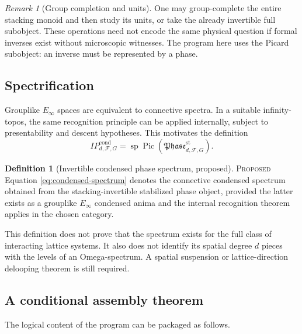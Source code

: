 \documentclass[12pt]{article}
\theoremstyle{definition}
\newtheorem{definition}[theorem]{Definition}
\theoremstyle{remark}
\newtheorem{remark}[theorem]{Remark}
\newcommand{\F}{\mathcal F}
\newcommand{\Phase}{\mathfrak{Phase}}
\newcommand{\Pic}{\operatorname{Pic}}
\newcommand{\IP}{\mathit{IP}}
\newcommand{\PROP}{\textnormal{\textsc{Proposed}}}
\begin{document}
\begin{remark}[Group completion and units]
One may group-complete the entire stacking monoid and then study its units,
or take the already invertible full subobject.  These operations need not
encode the same physical question if formal inverses exist without
microscopic witnesses.  The program here uses the Picard subobject: an
inverse must be represented by a phase.
\end{remark}

\subsection{Spectrification}

Grouplike $E_\infty$ spaces are equivalent to connective spectra.  In a
suitable infinity-topos, the same recognition principle can be applied
internally, subject to presentability and descent hypotheses.  This motivates
the definition
\begin{equation}
\IP^{\mathrm{cond}}_{d,\F,G}
=
\operatorname{sp}
\Pic(\Phase^{\mathrm{st}}_{d,\F,G}).
\label{eq:condensed-spectrum}
\end{equation}

\begin{definition}[Invertible condensed phase spectrum, proposed]
\PROP{}  Equation \cref{eq:condensed-spectrum} denotes the connective
condensed spectrum obtained from the stacking-invertible stabilized phase
object, provided the latter exists as a grouplike $E_\infty$ condensed anima
and the internal recognition theorem applies in the chosen category.
\end{definition}

This definition does not prove that the spectrum exists for the full class
of interacting lattice systems.  It also does not identify its spatial
degree $d$ pieces with the levels of an Omega-spectrum.  A spatial suspension
or lattice-direction delooping theorem is still required.

\subsection{A conditional assembly theorem}

The logical content of the program can be packaged as follows.
\end{document}
